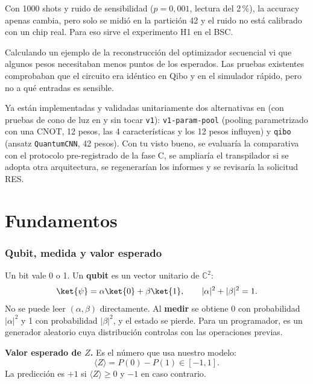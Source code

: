 \documentclass[11pt,a4paper]{article}
\begin{document}
\begin{description}[style=nextline,leftmargin=0.6cm]
\item[¿El ruido cambia los resultados?]
  Con 1000 shots y ruido de sensibilidad ($p=0{,}001$, lectura del 2\,\%), la accuracy apenas cambia, pero solo se
  midió en la partición 42 y el ruido no está calibrado con un chip real. Para eso sirve el experimento H1 en el BSC.

\item[¿Cómo descubriste lo del cono de luz y por qué no antes?]
  Calculando un ejemplo de la reconstrucción del optimizador secuencial vi que algunos pesos necesitaban menos puntos
  de los esperados. Las pruebas existentes comprobaban que el circuito era idéntico en Qibo y en el simulador rápido,
  pero no a qué entradas es sensible.

\item[¿Qué harías si lo corregimos?]
  Ya están implementadas y validadas unitariamente dos alternativas en  (con pruebas
  de cono de luz en  y sin tocar \texttt{v1}): \texttt{v1-param-pool} (pooling
  parametrizado con una CNOT, 12 pesos, las 4 características y los 12 pesos influyen) y \texttt{qibo} (ansatz
  \texttt{QuantumCNN}, 42 pesos). Con tu visto bueno, se evaluaría la comparativa con el protocolo pre-registrado de la
  fase C, se ampliaría el transpilador si se adopta otra arquitectura, se regenerarían los informes y se revisaría la
  solicitud RES.
\end{description}

\part{Fundamentos}

\section{Qubit, medida y valor esperado}

Un bit vale 0 o 1. Un \textbf{qubit} es un vector unitario de $\mathbb{C}^2$:
\[
  \ket{\psi} = \alpha\ket{0} + \beta\ket{1}, \qquad |\alpha|^2 + |\beta|^2 = 1 .
\]
No se puede leer $(\alpha, \beta)$ directamente. Al \textbf{medir} se obtiene 0 con probabilidad $|\alpha|^2$ y 1 con
probabilidad $|\beta|^2$, y el estado se pierde. Para un programador, es un generador aleatorio cuya distribución
controlas con las operaciones previas.

\textbf{Valor esperado de $Z$.} Es el número que usa nuestro modelo:
\[
  \langle Z\rangle = P(0) - P(1) \in [-1, 1].
\]
La predicción es $+1$ si $\langle Z\rangle \ge 0$ y $-1$ en caso contrario.
\end{document}
